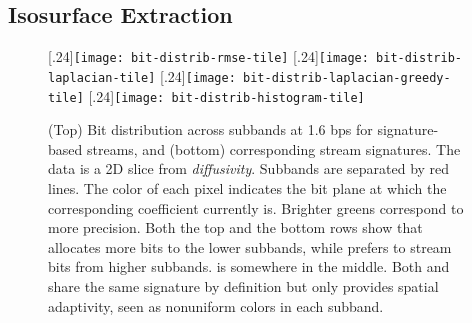 \subsection{Isosurface Extraction}\label{sec:isocontour}


\begin{figure}[!b]
\vspace{-1em}
\centering
 \subcaptionbox{\label{fig:bit-distrib-rmse-tile}$\srsg$}[.24\linewidth]{{\texttt{[image: bit-distrib-rmse-tile]}\vspace{-0.5em}}}
 \subcaptionbox{\label{fig:bit-distrib-laplacian-tile}$\slsg$}[.24\linewidth]{{\texttt{[image: bit-distrib-laplacian-tile]}\vspace{-0.5em}}}
 \subcaptionbox{\label{fig:bit-distrib-laplacian-greedy-tile}$\slop$}[.24\linewidth]{{\texttt{[image: bit-distrib-laplacian-greedy-tile]}\vspace{-0.5em}}}
 \subcaptionbox{\label{fig:bit-distrib-histogram-tile}$\shsg$}[.24\linewidth]{{\texttt{[image: bit-distrib-histogram-tile]}\vspace{-0.5em}}}
 \vspace{-0.5em}
\caption{(Top) Bit distribution across subbands at 1.6 bps for signature-based streams, and (bottom)
corresponding stream signatures. The data is a 2D slice from \emph{diffusivity}. Subbands are
separated by red lines. The color of each pixel indicates the bit plane at which the corresponding
coefficient currently is. Brighter greens correspond to more precision. Both the top and the bottom
rows show that \shsg allocates more bits to the lower subbands, while \slsg prefers to stream bits
from higher subbands. \srsg is somewhere in the middle. Both \slsg and \slop share the same
signature by definition but only \slop provides spatial adaptivity, seen as nonuniform colors in
each subband.}
\label{fig:bit-distrib}
\vspace{-1.5em}
\end{figure}

